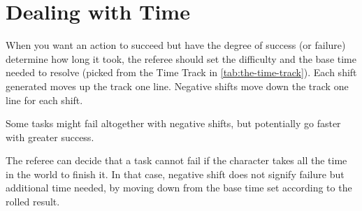 \section{Dealing with Time}
\label{sec:dealing-with-time}


When you want an action to succeed but have the degree of success (or failure) determine how long it took, the referee should set the difficulty and the base time needed to resolve (picked from the Time Track in \autoref{tab:the-time-track}). Each shift generated moves up the track one line. Negative shifts move down the track one line for each shift.

Some tasks might fail altogether with negative shifts, but potentially go faster with greater success.

The referee can decide that a task cannot fail if the character takes all the time in the world to finish it. In that case, negative shift does not signify failure but additional time needed, by moving down from the base time set according to the rolled result.


